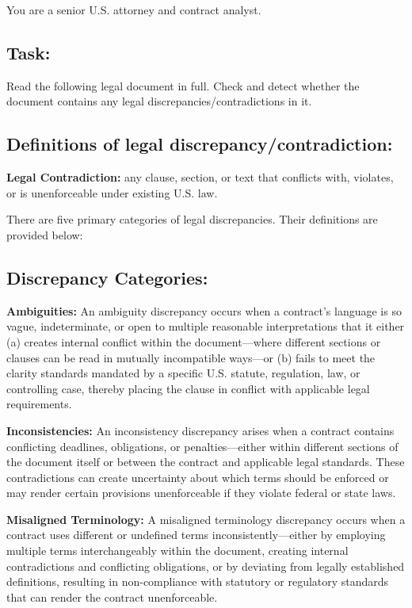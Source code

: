 \documentclass[11pt]{article}
\begin{document}
\begin{tcolorbox}[breakable,colback=lightestgray,colframe=black,title=\textbf{Eval\_3 L1: Legal Discrepancy Detection Prompt}]
You are a senior U.S. attorney and contract analyst.

\subsection*{\textbf{Task:}}
Read the following legal document in full. Check and detect whether the document contains any legal discrepancies/contradictions in it.

\subsection*{\textbf{Definitions of legal discrepancy/contradiction:}}
\textbf{Legal Contradiction:} any clause, section, or text that conflicts with, violates, or is unenforceable under existing U.S. law.

There are five primary categories of legal discrepancies. Their definitions are provided below:

\subsection*{\textbf{Discrepancy Categories:}}

\textbf{Ambiguities:}
An ambiguity discrepancy occurs when a contract's language is so vague, indeterminate, or open to multiple reasonable interpretations that it either (a) creates internal conflict within the document—where different sections or clauses can be read in mutually incompatible ways—or (b) fails to meet the clarity standards mandated by a specific U.S. statute, regulation, law, or controlling case, thereby placing the clause in conflict with applicable legal requirements.

\textbf{Inconsistencies:}
An inconsistency discrepancy arises when a contract contains conflicting deadlines, obligations, or penalties—either within different sections of the document itself or between the contract and applicable legal standards. These contradictions can create uncertainty about which terms should be enforced or may render certain provisions unenforceable if they violate federal or state laws.

\textbf{Misaligned Terminology:}
A misaligned terminology discrepancy occurs when a contract uses different or undefined terms inconsistently—either by employing multiple terms interchangeably within the document, creating internal contradictions and conflicting obligations, or by deviating from legally established definitions, resulting in non-compliance with statutory or regulatory standards that can render the contract unenforceable.


\end{tcolorbox}
\end{document}
